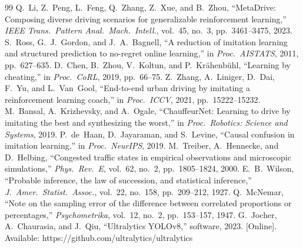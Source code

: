 \documentclass[conference]{IEEEtran}
\begin{document}
\begin{thebibliography}{99}
 Q.~Li, Z.~Peng, L.~Feng, Q.~Zhang, Z.~Xue, and B.~Zhou, ``MetaDrive: Composing diverse driving scenarios for generalizable reinforcement learning,'' \emph{IEEE Trans.\ Pattern Anal.\ Mach.\ Intell.}, vol.~45, no.~3, pp.~3461--3475, 2023.
 S.~Ross, G.~J.~Gordon, and J.~A.~Bagnell, ``A reduction of imitation learning and structured prediction to no-regret online learning,'' in \emph{Proc.\ AISTATS}, 2011, pp.~627--635.
 D.~Chen, B.~Zhou, V.~Koltun, and P.~Kr\"ahenb\"uhl, ``Learning by cheating,'' in \emph{Proc.\ CoRL}, 2019, pp.~66--75.
 Z.~Zhang, A.~Liniger, D.~Dai, F.~Yu, and L.~Van~Gool, ``End-to-end urban driving by imitating a reinforcement learning coach,'' in \emph{Proc.\ ICCV}, 2021, pp.~15222--15232.
 M.~Bansal, A.~Krizhevsky, and A.~Ogale, ``ChauffeurNet: Learning to drive by imitating the best and synthesizing the worst,'' in \emph{Proc.\ Robotics: Science and Systems}, 2019.
 P.~de~Haan, D.~Jayaraman, and S.~Levine, ``Causal confusion in imitation learning,'' in \emph{Proc.\ NeurIPS}, 2019.
 M.~Treiber, A.~Hennecke, and D.~Helbing, ``Congested traffic states in empirical observations and microscopic simulations,'' \emph{Phys.\ Rev.\ E}, vol.~62, no.~2, pp.~1805--1824, 2000.
 E.~B.~Wilson, ``Probable inference, the law of succession, and statistical inference,'' \emph{J.\ Amer.\ Statist.\ Assoc.}, vol.~22, no.~158, pp.~209--212, 1927.
 Q.~McNemar, ``Note on the sampling error of the difference between correlated proportions or percentages,'' \emph{Psychometrika}, vol.~12, no.~2, pp.~153--157, 1947.
 G.~Jocher, A.~Chaurasia, and J.~Qiu, ``Ultralytics YOLOv8,'' software, 2023. [Online]. Available: https://github.com/ultralytics/ultralytics
\end{thebibliography}
\end{document}

